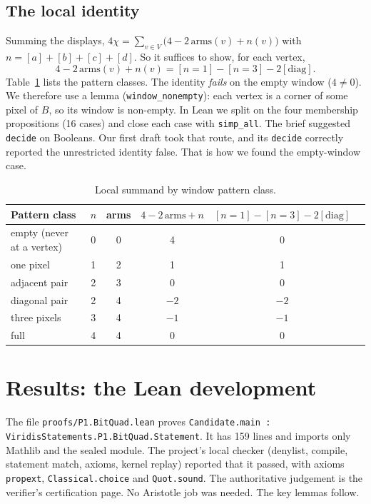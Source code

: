 \documentclass[11pt]{article}
\theoremstyle{definition}
\theoremstyle{remark}
\begin{document}
\subsection{The local identity}
Summing the displays,
$4\chi = \sum_{v\in V} \big(4 - 2\,\mathrm{arms}(v) + n(v)\big)$ with
$n = [a]+[b]+[c]+[d]$. So it suffices to show, for each vertex,
\[
  4 - 2\,\mathrm{arms}(v) + n(v) = [n=1] - [n=3] - 2[\mathrm{diag}].
\]
Table~\ref{tab:local} lists the pattern classes. The identity \emph{fails} on
the empty window ($4\neq0$). We therefore use a lemma
(\texttt{window\_nonempty}): each vertex is a corner of some pixel of $B$, so
its window is non-empty. In Lean we split on the four membership propositions
(16 cases) and close each case with \texttt{simp\_all}. The brief suggested
\texttt{decide} on Booleans. Our first draft took that route, and its
\texttt{decide} correctly reported the unrestricted identity false. That is how
we found the empty-window case.

\begin{table}[h]
\centering
\begin{tabular}{lccccc}
\toprule
Pattern class & $n$ & arms & $4-2\,\mathrm{arms}+n$ & $[n{=}1]-[n{=}3]-2[\mathrm{diag}]$\\
\midrule
empty (never at a vertex) & 0 & 0 & 4 & 0\\
one pixel & 1 & 2 & 1 & 1\\
adjacent pair & 2 & 3 & 0 & 0\\
diagonal pair & 2 & 4 & $-2$ & $-2$\\
three pixels & 3 & 4 & $-1$ & $-1$\\
full & 4 & 4 & 0 & 0\\
\bottomrule
\end{tabular}
\caption{Local summand by window pattern class.}
\label{tab:local}
\end{table}

\section{Results: the Lean development}

The file \texttt{proofs/P1.BitQuad.lean} proves
\texttt{Candidate.main : ViridisStatements.P1.BitQuad.Statement}. It has 159
lines and imports only Mathlib and the sealed module. The project's local
checker (denylist, compile, statement match, axioms, kernel replay) reported
that it passed, with axioms \texttt{propext}, \texttt{Classical.choice} and
\texttt{Quot.sound}. The authoritative judgement is the verifier's
certification page. No Aristotle job was needed. The key lemmas follow.
\end{document}
